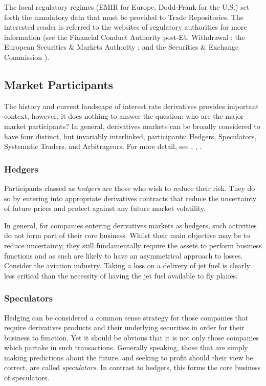 The local regulatory regimes (EMIR for Europe, Dodd-Frank for the U.S.) set forth the mandatory data that must be provided to Trade Repositories. The interested reader is referred to the websites of regulatory authorities for more information (see the Financial Conduct Authority post-EU Withdrawal \citep{FCA_Ch2_1}; the European Securities \& Markets Authority \citep{ESMA_Ch2_1}; and the Securities \& Exchange Commission \citep{SEC_Ch2_1}).

\subsection{Market Participants}
The history and current landscape of interest rate derivatives provides important context, however, it does nothing to answer the question: who are the major market participants? In general, derivatives markets can be broadly considered to have four distinct, but invariably interlinked, participants: Hedgers, Speculators, Systematic Traders, and Arbitrageurs. For more detail, see \cite{chernenko2011two}, \cite{chui2012derivatives}, \cite{stankovska2017global}.

\subsubsection*{Hedgers}
Participants classed as \textit{hedgers} are those who wish to reduce their risk. They do so by entering into appropriate derivatives contracts that reduce the uncertainty of future prices and protect against any future market volatility. 

In general, for companies entering derivatives markets as hedgers, such activities do not form part of their core business. Whilst their main objective may be to reduce uncertainty, they still fundamentally require the assets to perform business functions and as such are likely to have an asymmetrical approach to losses. Consider the aviation industry. Taking a loss on a delivery of jet fuel is clearly less critical than the necessity of having the jet fuel available to fly planes.

\subsubsection*{Speculators}
Hedging can be considered a common sense strategy for those companies that require derivatives products and their underlying securities in order for their business to function. Yet it should be obvious that it is not only those companies which partake in such transactions. Generally speaking, those that are simply making predictions about the future, and seeking to profit should their view be correct, are called \textit{speculators}. In contrast to hedgers, this forms the core business of speculators. 

